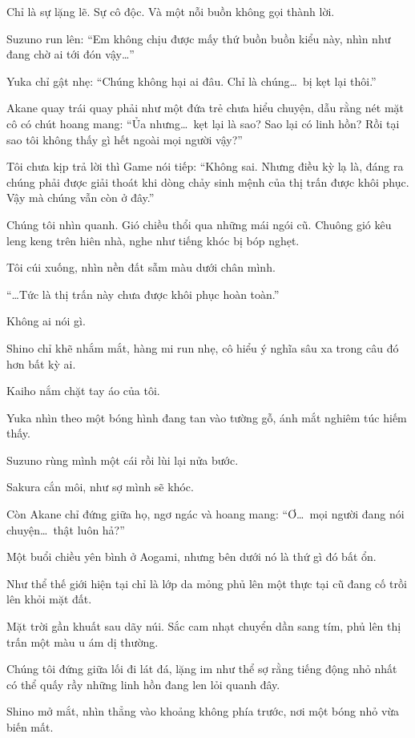 \documentclass[../main.tex]{subfiles}
\begin{document}
Chỉ là sự lặng lẽ. Sự cô độc. Và một nỗi buồn không gọi thành lời.

Suzuno run lên: ``Em không chịu được mấy thứ buồn buồn kiểu này, nhìn như đang chờ ai tới đón vậy\dots''

Yuka chỉ gật nhẹ: ``Chúng không hại ai đâu. Chỉ là chúng\dots\ bị kẹt lại thôi.''

Akane quay trái quay phải như một đứa trẻ chưa hiểu chuyện, dẫu rằng nét mặt cô có chút hoang mang: ``Ủa nhưng\dots\ kẹt lại là sao? Sao lại có linh hồn? Rồi tại sao tôi không thấy gì hết ngoài mọi người vậy?''

Tôi chưa kịp trả lời thì Game nói tiếp: ``Không sai. Nhưng điều kỳ lạ là, đáng ra chúng phải được giải thoát khi dòng chảy sinh mệnh của thị trấn được khôi phục. Vậy mà chúng vẫn còn ở đây.''

Chúng tôi nhìn quanh. Gió chiều thổi qua những mái ngói cũ. Chuông gió kêu leng keng trên hiên nhà, nghe như tiếng khóc bị bóp nghẹt.

Tôi cúi xuống, nhìn nền đất sẫm màu dưới chân mình.

``\dots Tức là thị trấn này chưa được khôi phục hoàn toàn.''

Không ai nói gì.

Shino chỉ khẽ nhắm mắt, hàng mi run nhẹ, cô hiểu ý nghĩa sâu xa trong câu đó hơn bất kỳ ai.

Kaiho nắm chặt tay áo của tôi.

Yuka nhìn theo một bóng hình đang tan vào tường gỗ, ánh mắt nghiêm túc hiếm thấy.

Suzuno rùng mình một cái rồi lùi lại nửa bước.

Sakura cắn môi, như sợ mình sẽ khóc.

Còn Akane chỉ đứng giữa họ, ngơ ngác và hoang mang: ``Ơ\dots\ mọi người đang nói chuyện\dots\ thật luôn hả?''

Một buổi chiều yên bình ở Aogami, nhưng bên dưới nó là thứ gì đó bất ổn.

Như thể thế giới hiện tại chỉ là lớp da mỏng phủ lên một thực tại cũ đang cố trồi lên khỏi mặt đất.

\ct

Mặt trời gần khuất sau dãy núi. Sắc cam nhạt chuyển dần sang tím, phủ lên thị trấn một màu u ám dị thường.

Chúng tôi đứng giữa lối đi lát đá, lặng im như thể sợ rằng tiếng động nhỏ nhất có thể quấy rầy những linh hồn đang len lỏi quanh đây.

Shino mở mắt, nhìn thẳng vào khoảng không phía trước, nơi một bóng nhỏ vừa biến mất.
\end{document}
